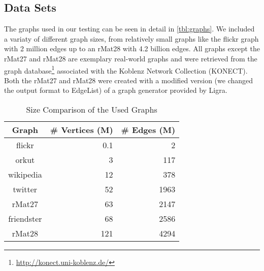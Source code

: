\subsection{Data Sets}
The graphs used in our testing can be seen in detail in \autoref{tbl:graphs}. We included a variaty of different graph sizes, from relatively small graphs like the flickr graph with 2 million edges up to an rMat28 with 4.2 billion edges. All graphs except the rMat27 and rMat28 are exemplary real-world graphs and were retrieved from the graph database\footnote{\url{http://konect.uni-koblenz.de/}} associated with the Koblenz Network Collection (KONECT)\cite{konect}.
Both the rMat27 and rMat28 were created with a modified version (we changed the output format to EdgeList) of a graph generator provided by Ligra.
\begin{table}
	\centering
	\caption{Size Comparison of the Used Graphs}
	\begin{tabular}{crr}
		\hline
		\bf{Graph}&\# Vertices (M)&\# Edges (M)\\\hline
		flickr&    		0.1&  2\\
		orkut&          3&    117\\
		wikipedia&      12&   378\\
		twitter&     	52&   1963\\
		rMat27&         63&   2147\\
		friendster&     68&   2586\\
		rMat28&         121&  4294\\
		\hline
	\end{tabular}
	\label{tbl:graphs}
\end{table}


